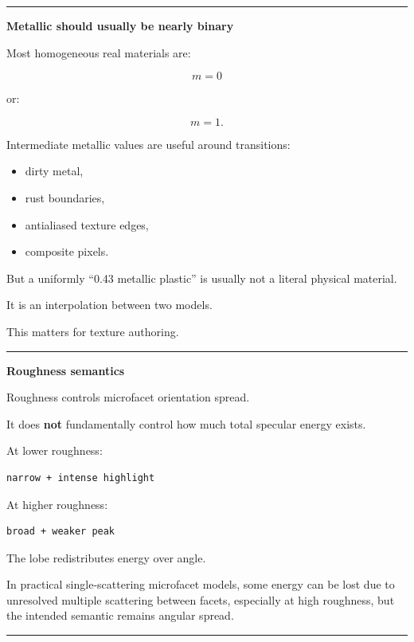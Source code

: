 \begin{center}\rule{0.5\linewidth}{0.5pt}\end{center}

\textbf{Metallic should usually be nearly binary}

Most homogeneous real materials are:

\[
m=0
\]

or:

\[
m=1.
\]

Intermediate metallic values are useful around transitions:

\begin{itemize}
\tightlist
\item
  dirty metal,
\item
  rust boundaries,
\item
  antialiased texture edges,
\item
  composite pixels.
\end{itemize}

But a uniformly ``0.43 metallic plastic'' is usually not a literal physical material.

It is an interpolation between two models.

This matters for texture authoring.

\begin{center}\rule{0.5\linewidth}{0.5pt}\end{center}

\textbf{Roughness semantics}

Roughness controls microfacet orientation spread.

It does \textbf{not} fundamentally control how much total specular energy exists.

At lower roughness:

\begin{verbatim}
narrow + intense highlight
\end{verbatim}

At higher roughness:

\begin{verbatim}
broad + weaker peak
\end{verbatim}

The lobe redistributes energy over angle.

In practical single-scattering microfacet models, some energy can be lost due to unresolved multiple scattering between facets, especially at high roughness, but the intended semantic remains angular spread.

\begin{center}\rule{0.5\linewidth}{0.5pt}\end{center}

